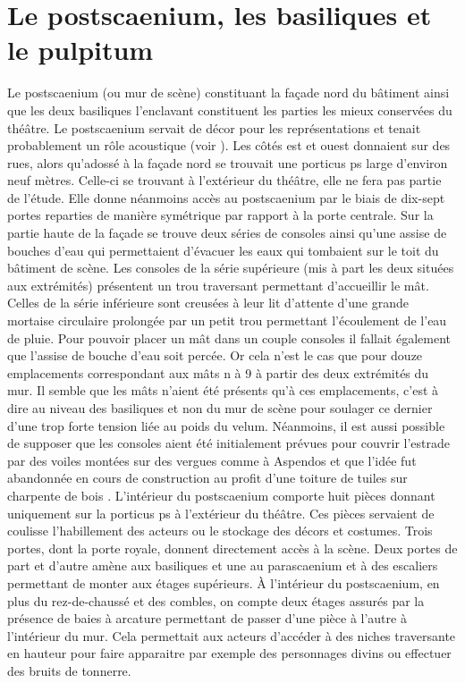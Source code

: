		\section{Le \gls{postscaenium}, les \glspl{basilique} et le \gls{pulpitum}}
		
		Le \gls{postscaenium} (ou mur de scène) constituant la façade nord du bâtiment ainsi que les deux \glspl{basilique} l'enclavant constituent les parties les mieux conservées du théâtre. Le \gls{postscaenium} servait de décor pour les représentations et tenait probablement un rôle acoustique (voir ). Les côtés est et ouest donnaient sur des rues, alors qu'adossé à la façade nord se trouvait une \gls{porticus ps} large d'environ neuf mètres. Celle-ci se trouvant à l'extérieur du théâtre, elle ne fera pas partie de l'étude. Elle donne néanmoins accès au \gls{postscaenium} par le biais de dix-sept portes reparties de manière symétrique par rapport à la porte centrale. Sur la partie haute de la façade se trouve deux séries de \glspl{console} ainsi qu'une assise de bouches d'eau qui permettaient d'évacuer les eaux qui tombaient sur le toit du bâtiment de scène. Les \glspl{console} de la série supérieure (mis à part les deux situées aux extrémités) présentent un trou traversant permettant d'accueillir le mât. Celles de la série inférieure sont creusées à leur lit d'attente d'une grande mortaise circulaire prolongée par un petit trou permettant l'écoulement de l'eau de pluie. Pour pouvoir placer un mât dans un couple \glspl{console} il fallait également que l'assise de bouche d'eau soit percée. Or cela n'est le cas que pour douze emplacements correspondant aux mâts n à 9 à partir des deux extrémités du mur. Il semble que les mâts n'aient été présents qu'à ces emplacements, c'est à dire au niveau des \glspl{basilique} et non du mur de scène pour soulager ce dernier d'une trop forte tension liée au poids du \gls{velum}. Néanmoins, il est aussi possible de supposer que les \glspl{console} aient été initialement prévues pour couvrir l'estrade par des voiles montées sur des vergues comme à Aspendos et que l'idée fut abandonnée en cours de construction au profit d'une toiture de tuiles sur charpente de bois \cite{moretti}. L'intérieur du \gls{postscaenium} comporte huit pièces donnant uniquement sur la \gls{porticus ps} à l'extérieur du théâtre. Ces pièces servaient de coulisse l'habillement des acteurs ou le stockage des décors et costumes. Trois portes, dont la porte royale, donnent directement accès à la scène. Deux portes de part et d'autre amène aux \glspl{basilique} et une au \gls{parascaenium} et à des escaliers permettant de monter aux étages supérieurs. \`{A} l'intérieur du \gls{postscaenium}, en plus du rez-de-chaussé et des combles, on compte deux étages assurés par la présence de baies à arcature permettant de passer d'une pièce à l'autre à l'intérieur du mur. Cela permettait aux acteurs d'accéder à des niches traversante en hauteur pour faire apparaitre par exemple des personnages divins ou effectuer des bruits de tonnerre. 
		
